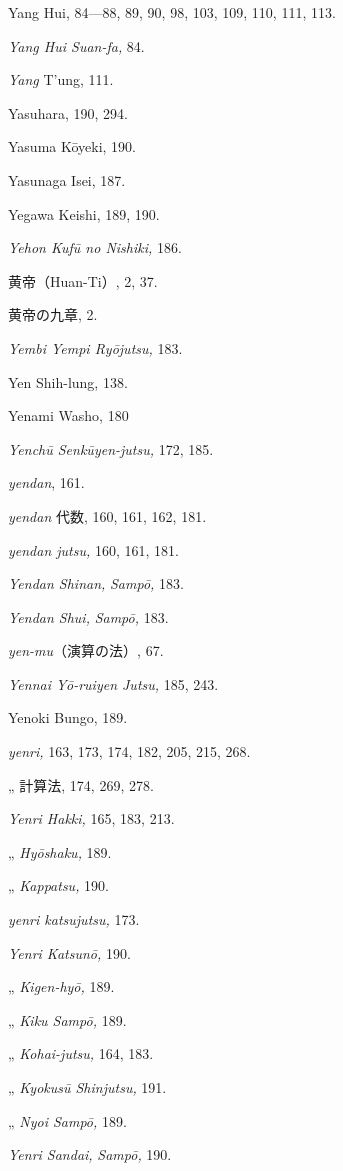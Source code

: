 \documentclass[11pt]{article}
\begin{document}
Yang Hui, 84---88, 89, 90, 98, 103, 109, 110, 111, 113.\par
\emph{Yang Hui Suan-fa,} 84.\par
\emph{Yang} T'ung, 111.\par
Yasuhara, 190, 294.\par
Yasuma Kōyeki, 190.\par
Yasunaga Isei, 187.\par
Yegawa Keishi, 189, 190.\par
\emph{Yehon Kufū no Nishiki,} 186.\par
黄帝（Huan-Ti）, 2, 37.\par
黄帝の九章, 2.\par
\emph{Yembi Yempi Ryōjutsu,} 183.\par
Yen Shih-lung, 138.\par
Yenami Washo, 180\par
\emph{Yenchū Senkūyen-jutsu,} 172, 185.\par
\emph{yendan}, 161.\par
\emph{yendan} 代数, 160, 161, 162, 181.\par
\emph{yendan jutsu,} 160, 161, 181.\par
\emph{Yendan Shinan,} \emph{Sampō,} 183.\par
\emph{Yendan Shui,} \emph{Sampō,} 183.\par
\emph{yen-mu}（演算の法）, 67.\par
\emph{Yennai Yō-ruiyen Jutsu,} 185, 243.\par
Yenoki Bungo, 189.\par
\emph{yenri,} 163, 173, 174, 182, 205, 215, 268.\par
\quad „ 計算法, 174, 269, 278.\par
\emph{Yenri Hakki,} 165, 183, 213.\par
\quad „ \emph{Hyōshaku,} 189.\par
\quad „ \emph{Kappatsu,} 190.\par
\emph{yenri katsujutsu,} 173.\par
\emph{Yenri Katsunō,} 190.\par
\quad „ \emph{Kigen-hyō,} 189.\par
\quad „ \emph{Kiku Sampō,} 189.\par
\quad „ \emph{Kohai-jutsu,} 164, 183.\par
\quad „ \emph{Kyokusū Shinjutsu,} 191.\par
\quad „ \emph{Nyoi Sampō,} 189.\par
\emph{Yenri Sandai,} \emph{Sampō,} 190.\par
\end{document}

